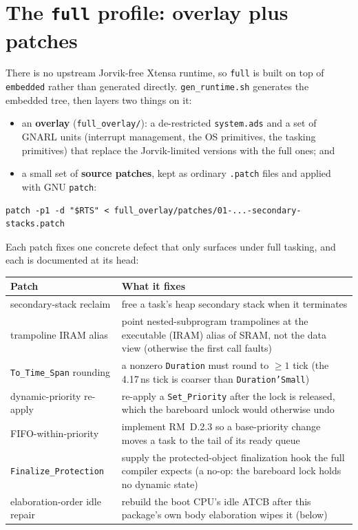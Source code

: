 \section{The \texttt{full} profile: overlay plus patches}

There is no upstream Jorvik-free Xtensa runtime, so \texttt{full} is built on top
of \texttt{embedded} rather than generated directly. \texttt{gen\_runtime.sh}
generates the embedded tree, then layers two things on it:

\begin{itemize}
\item an \textbf{overlay} (\texttt{full\_overlay/}): a de-restricted
  \texttt{system.ads} and a set of GNARL units (interrupt management, the OS
  primitives, the tasking primitives) that replace the Jorvik-limited versions
  with the full ones; and
\item a small set of \textbf{source patches}, kept as ordinary \texttt{.patch}
  files and applied with GNU \texttt{patch}:
\end{itemize}

\begin{lstlisting}[style=sh]
patch -p1 -d "$RTS" < full_overlay/patches/01-...-secondary-stacks.patch
\end{lstlisting}

Each patch fixes one concrete defect that only surfaces under full tasking, and
each is documented at its head:

\begin{center}
\begin{tabular}{p{4.6cm} p{8.6cm}}
\toprule
\textbf{Patch} & \textbf{What it fixes} \\ \midrule
secondary-stack reclaim & free a task's heap secondary stack when it terminates \\
trampoline IRAM alias & point nested-subprogram trampolines at the executable
  (IRAM) alias of SRAM, not the data view (otherwise the first call faults) \\
\texttt{To\_Time\_Span} rounding & a nonzero \texttt{Duration} must round to
  $\geq 1$ tick (the 4.17\,ns tick is coarser than \texttt{Duration'Small}) \\
dynamic-priority re-apply & re-apply a \texttt{Set\_Priority} after the lock is
  released, which the bareboard unlock would otherwise undo \\
FIFO-within-priority & implement RM~D.2.3 so a base-priority change moves a task
  to the tail of its ready queue \\
\texttt{Finalize\_Protection} & supply the protected-object finalization hook
  the full compiler expects (a no-op: the bareboard lock holds no dynamic
  state) \\
elaboration-order idle repair & rebuild the boot CPU's idle ATCB after this
  package's own body elaboration wipes it (below) \\
\bottomrule
\end{tabular}
\end{center}

